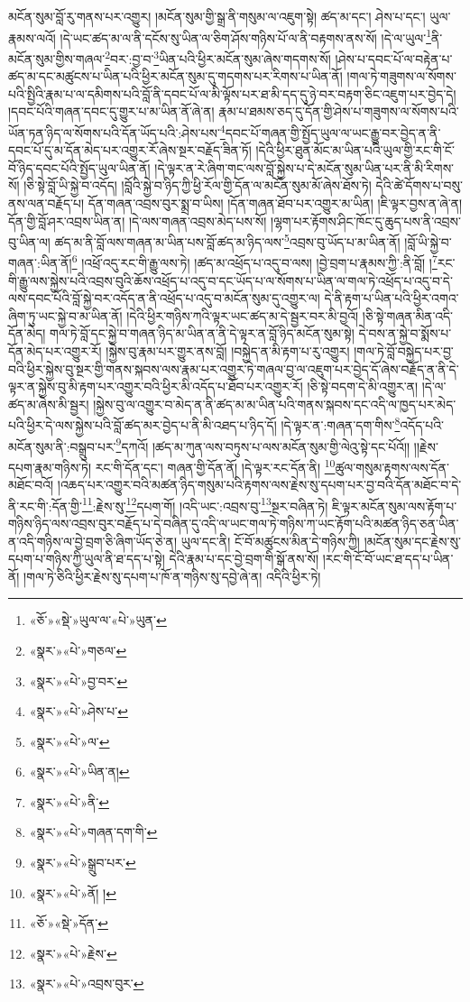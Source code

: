མངོན་སུམ་བློ་རུ་གནས་པར་འགྱུར། །མངོན་སུམ་གྱི་སྒྲ་ནི་གསུམ་ལ་འཇུག་སྟེ། ཚད་མ་དང་། ཤེས་པ་དང་། ཡུལ་རྣམས་ལའོ། །དེ་ཡང་ཚད་མ་ལ་ནི་དངོས་སུ་ཡིན་ལ་ཅིག་ཤོས་གཉིས་པོ་ལ་ནི་བརྟགས་ནས་སོ། །དེ་ལ་ཡུལ་\footnote{«ཅོ་»«སྡེ་»ཡུལ་ལ་«པེ་»ཡུན་}ནི་མངོན་སུམ་གྱིས་གཞལ་\footnote{«སྣར་»«པེ་»གཅལ་}བར་:བྱ་བ་\footnote{«སྣར་»«པེ་»བྱ་བར་}ཡིན་པའི་ཕྱིར་མངོན་སུམ་ཞེས་གདགས་སོ། །ཤེས་པ་དབང་པོ་ལ་བརྟེན་པ་ཚད་མ་དང་མཚུངས་པ་ཡིན་པའི་ཕྱིར་མངོན་སུམ་དུ་གདགས་པར་རིགས་པ་ཡིན་ནོ། །གལ་ཏེ་གཟུགས་ལ་སོགས་པའི་སྤྱིའི་རྣམ་པ་ལ་དམིགས་པའི་བློ་ནི་དབང་པོ་ལ་མི་ལྟོས་པར་ཐ་མི་དད་དུ་ཉེ་བར་བརྟག་ཅིང་འཇུག་པར་བྱེད་དེ། །དབང་པོའི་གཞན་དབང་དུ་གྱུར་པ་མ་ཡིན་ནོ་ཞེ་ན། རྣམ་པ་ཐམས་ཅད་དུ་དོན་གྱི་ཤེས་པ་གཟུགས་ལ་སོགས་པའི་ཡོན་ཏན་ཉིད་ལ་སོགས་པའི་དོན་ཡོད་པའི་:ཤེས་པས་\footnote{«སྣར་»«པེ་»ཤེས་པ་}དབང་པོ་གཞན་གྱི་སྤྱོད་ཡུལ་ལ་ཡང་རྒྱུ་བར་བྱེད་ན་ནི་དབང་པོ་དུ་མ་དོན་མེད་པར་འགྱུར་རོ་ཞེས་སྔར་བརྗོད་ཟིན་ཏོ། །དེའི་ཕྱིར་ཐུན་མོང་མ་ཡིན་པའི་ཡུལ་གྱི་རང་གི་ངོ་བོ་ཉིད་དབང་པོའི་སྤྱོད་ཡུལ་ཡིན་ནོ། །དེ་ལྟར་ན་རེ་ཞིག་གང་ལས་བློ་སྐྱེས་པ་དེ་མངོན་སུམ་ཡིན་པར་ནི་མི་རིགས་སོ། །ཅི་སྟེ་བློ་ཡི་སྐྱེ་བ་འདོད། །བློའི་སྐྱེ་བ་ཉིད་ཀྱི་ཕྱི་རོལ་གྱི་དོན་ལ་མངོན་སུམ་མོ་ཞེས་ཐོས་ཏེ། དེའི་ཚེ་དོགས་པ་བསུ་ནས་ལན་བརྗོད་པ། དོན་གཞན་འབྲས་བུར་སྨྲ་བ་ཡིས། །དོན་གཞན་ཐོབ་པར་འགྱུར་མ་ཡིན། །ཇི་ལྟར་བྱས་ན་ཞེ་ན། དོན་གྱི་བློ་ཤར་འབྲས་ཡིན་ན། །དེ་ལས་གཞན་འབྲས་མེད་པས་སོ། །ལྷག་པར་རྟོགས་ཤིང་ཁོང་དུ་ཆུད་པས་ནི་འབྲས་བུ་ཡིན་ལ། ཚད་མ་ནི་བློ་ལས་གཞན་མ་ཡིན་པས་བློ་ཚད་མ་ཉིད་ལས་\footnote{«སྣར་»«པེ་»ལ་}འབྲས་བུ་ཡོད་པ་མ་ཡིན་ནོ། །བློ་ཡི་སྐྱེ་བ་གཞན་:ཡིན་ནོ།\footnote{«སྣར་»«པེ་»ཡིན་ན།} །འཕྲོ་འདུ་རང་གི་རྒྱུ་ལས་ཏེ། །ཚད་མ་འཕྲོད་པ་འདུ་བ་ལས། །བྱེ་བྲག་པ་རྣམས་ཀྱི་:ནི་བློ། །\footnote{«སྣར་»«པེ་»ནི་}རང་གི་རྒྱུ་ལས་སྐྱེས་པའི་འབྲས་བུའི་ཆོས་འཕྲོད་པ་འདུ་བ་དང་ཡོད་པ་ལ་སོགས་པ་ཡིན་ལ་གལ་ཏེ་འཕྲོད་པ་འདུ་བ་དེ་ལས་དབང་པོའི་བློ་སྐྱེ་བར་འདོད་ན་ནི་འཕྲོད་པ་འདུ་བ་མངོན་སུམ་དུ་འགྱུར་ལ། དེ་ནི་རྟག་པ་ཡིན་པའི་ཕྱིར་འགའ་ཞིག་ཏུ་ཡང་སྐྱེ་བ་མ་ཡིན་ནོ། །དེའི་ཕྱིར་གཉིས་ཀའི་ལྟར་ཡང་ཚད་མ་དེ་སྦྱར་བར་མི་བྱའོ། །ཅི་སྟེ་གཞན་མིན་འདི་དོན་མེད། གལ་ཏེ་བློ་དང་སྐྱེ་བ་གཞན་ཉིད་མ་ཡིན་ན་ནི་དེ་ལྟར་ན་བློ་ཉིད་མངོན་སུམ་སྟེ། དེ་བས་ན་སྐྱེ་བ་སྨོས་པ་དོན་མེད་པར་འགྱུར་རོ། །སྐྱེས་བུ་རྣམ་པར་གྱུར་ནས་བློ། །བསྐྱེད་ན་མི་རྟག་པ་རུ་འགྱུར། །གལ་ཏེ་བློ་བསྐྱེད་པར་བྱ་བའི་ཕྱིར་སྐྱེས་བུ་སྔར་གྱི་གནས་སྐབས་ལས་རྣམ་པར་འགྱུར་ཏེ་གཞལ་བྱ་ལ་འཇུག་པར་བྱེད་དོ་ཞེས་བརྗོད་ན་ནི་དེ་ལྟར་ན་སྐྱེས་བུ་མི་རྟག་པར་འགྱུར་བའི་ཕྱིར་མི་འདོད་པ་ཐོབ་པར་འགྱུར་རོ། །ཅི་སྟེ་བདག་དེ་མི་འགྱུར་ན། །དེ་ལ་ཚད་མ་ཞེས་མི་སྦྱར། །སྐྱེས་བུ་ལ་འགྱུར་བ་མེད་ན་ནི་ཚད་མ་མ་ཡིན་པའི་གནས་སྐབས་དང་འདི་ལ་ཁྱད་པར་མེད་པའི་ཕྱིར་དེ་ལས་སྐྱེས་པའི་བློ་ཚད་མར་བྱེད་པ་ནི་མི་འཐད་པ་ཉིད་དོ། །དེ་ལྟར་ན་:གཞན་དག་གིས་\footnote{«སྣར་»«པེ་»གཞན་དག་གི་}འདོད་པའི་མངོན་སུམ་ནི་:བསྒྲུབ་པར་\footnote{«སྣར་»«པེ་»སྒྲུབ་པར་}དཀའོ། །ཚད་མ་ཀུན་ལས་བཏུས་པ་ལས་མངོན་སུམ་གྱི་ལེའུ་སྟེ་དང་པོའོ།། །།རྗེས་དཔག་རྣམ་གཉིས་ཏེ། རང་གི་དོན་དང་། གཞན་གྱི་དོན་ནོ། །དེ་ལྟར་རང་དོན་ནི། \footnote{«སྣར་»«པེ་»ནོ། ། }ཚུལ་གསུམ་རྟགས་ལས་དོན་མཐོང་བའོ། །འཆད་པར་འགྱུར་བའི་མཚན་ཉིད་གསུམ་པའི་རྟགས་ལས་རྗེས་སུ་དཔག་པར་བྱ་བའི་དོན་མཐོང་བ་དེ་ནི་རང་གི་:དོན་གྱི་\footnote{«ཅོ་»«སྡེ་»དོན་}:རྗེས་སུ་\footnote{«སྣར་»«པེ་»རྗེས་}དཔག་གོ། །འདི་ཡང་:འབྲས་བུ་\footnote{«སྣར་»«པེ་»འབྲས་བུར་}སྔར་བཞིན་ཏེ། ཇི་ལྟར་མངོན་སུམ་ལས་རྟོག་པ་གཉིས་ཉིད་ལས་འབྲས་བུར་བརྗོད་པ་དེ་བཞིན་དུ་འདི་ལ་ཡང་གལ་ཏེ་གཉིས་ཀ་ཡང་རྟོག་པའི་མཚན་ཉིད་ཅན་ཡིན་ན་འདི་གཉིས་ལ་བྱེ་བྲག་ཅི་ཞིག་ཡོད་ཅེ་ན། ཡུལ་དང་ནི། ངོ་བོ་མཚུངས་མིན་དེ་གཉིས་ཀྱི། །མངོན་སུམ་དང་རྗེས་སུ་དཔག་པ་གཉིས་ཀྱི་ཡུལ་ནི་ཐ་དད་པ་སྟེ། དེའི་རྣམ་པ་དང་བྱེ་བྲག་གི་སྒོ་ནས་སོ། །རང་གི་ངོ་བོ་ཡང་ཐ་དད་པ་ཡིན་ནོ། །གལ་ཏེ་ཅིའི་ཕྱིར་རྗེས་སུ་དཔག་པ་ཁོ་ན་གཉིས་སུ་དབྱེ་ཞེ་ན། འདིའི་ཕྱིར་ཏེ། 